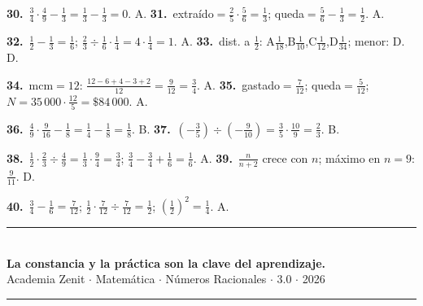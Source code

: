 \documentclass[11pt, letterpaper]{article}
\begin{document}
\textbf{30.}~$\tfrac{3}{4}\cdot\tfrac{4}{9}-\tfrac{1}{3}=\tfrac{1}{3}-\tfrac{1}{3}=0$. A. \quad
\textbf{31.}~extra\'ido$=\tfrac{2}{5}\cdot\tfrac{5}{6}=\tfrac{1}{3}$; queda$=\tfrac{5}{6}-\tfrac{1}{3}=\tfrac{1}{2}$. A.

\textbf{32.}~$\tfrac{1}{2}-\tfrac{1}{3}=\tfrac{1}{6}$; $\tfrac{2}{3}\div\tfrac{1}{6}\cdot\tfrac{1}{4}=4\cdot\tfrac{1}{4}=1$. A. \quad
\textbf{33.}~dist. a $\tfrac{1}{2}$: A$\tfrac{1}{18}$,B$\tfrac{1}{10}$,C$\tfrac{1}{12}$,D$\tfrac{1}{34}$; menor: D. D.

\textbf{34.}~mcm$=12$: $\tfrac{12-6+4-3+2}{12}=\tfrac{9}{12}=\tfrac{3}{4}$. A. \quad
\textbf{35.}~gastado$=\tfrac{7}{12}$; queda$=\tfrac{5}{12}$; $N=35\,000\cdot\tfrac{12}{5}=\$84\,000$. A.

\textbf{36.}~$\tfrac{4}{9}\cdot\tfrac{9}{16}-\tfrac{1}{8}=\tfrac{1}{4}-\tfrac{1}{8}=\tfrac{1}{8}$. B. \quad
\textbf{37.}~$(-\tfrac{3}{5})\div(-\tfrac{9}{10})=\tfrac{3}{5}\cdot\tfrac{10}{9}=\tfrac{2}{3}$. B.

\textbf{38.}~$\tfrac{1}{2}\cdot\tfrac{2}{3}\div\tfrac{4}{9}=\tfrac{1}{3}\cdot\tfrac{9}{4}=\tfrac{3}{4}$; $\tfrac{3}{4}-\tfrac{3}{4}+\tfrac{1}{6}=\tfrac{1}{6}$. A. \quad
\textbf{39.}~$\tfrac{n}{n+2}$ crece con $n$; m\'aximo en $n=9$: $\tfrac{9}{11}$. D.

\textbf{40.}~$\tfrac{3}{4}-\tfrac{1}{6}=\tfrac{7}{12}$; $\tfrac{1}{2}\cdot\tfrac{7}{12}\div\tfrac{7}{12}=\tfrac{1}{2}$; $\left(\tfrac{1}{2}\right)^2=\tfrac{1}{4}$. A.

\vspace{8pt}
\begin{center}
  \rule{\linewidth}{1.5pt}\\[4pt]
  {\large\bfseries\color{zenitnavy} La constancia y la pr\'actica son la clave del aprendizaje.}\\[2pt]
  {\color{zenitgold}\small Academia Zenit $\cdot$ Matem\'atica $\cdot$ N\'umeros Racionales $\cdot$ 3.0 $\cdot$ 2026}\\[4pt]
  \rule{\linewidth}{1.5pt}
\end{center}
\end{document}
